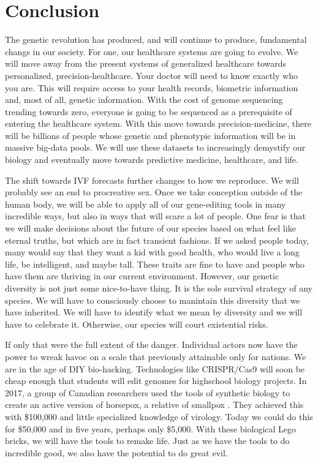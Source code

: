 \section{Conclusion}
\label{sec:conclusion}

The genetic revolution has produced, and will continue to produce, fundamental changs in our society.
For one, our healthcare systems are going to evolve.
We will move away from the present systems of generalized healthcare towards personalized, precision-healthcare.
Your doctor will need to know exactly who you are.
This will require access to your health records, biometric information and, most of all, genetic information.
With the cost of genome sequencing trending towards zero, everyone is going to be sequenced as a prerequisite of entering the healthcare system.
With this move towards precision-medicine, there will be billions of people whose genetic and phenotypic information will be in massive big-data pools.
We will use these datasets to increasingly demystify our biology and eventually move towards predictive medicine, healthcare, and life.

The shift towards IVF forecasts further changes to how we reproduce.
We will probably see an end to procreative sex.
Once we take conception outside of the human body, we will be able to apply all of our gene-editing tools in many incredible ways, but also in ways that will scare a lot of people.
One fear is that we will make decisions about the future of our species based on what feel like eternal truths, but which are in fact transient fashions.
If we asked people today, many would say that they want a kid with good health, who would live a long life, be intelligent, and maybe tall.
These traits are fine to have and people who have them are thriving in our current environment.
However, our genetic diversity is not just some nice-to-have thing.
It is the sole survival strategy of any species.
We will have to consciously choose to manintain this diversity that we have inherited.
We will have to identify what we mean by diversity and we will have to celebrate it.
Otherwise, our species will court existential risks.

If only that were the full extent of the danger.
Individual actors now have the power to wreak havoc on a scale that previously attainable only for nations.
We are in the age of DIY bio-hacking.
Technologies like CRISPR/Cas9 will soon be cheap enough that students will edit genomes for highschool biology projects.
In 2017, a group of Canadian researchers used the tools of synthetic biology to create an active version of horsepox, a relative of smallpox \cite{Kupferschmidt2017}.
They achieved this with \$100,000 and little specialized knowledge of virology.
Today we could do this for \$50,000 and in five years, perhaps only \$5,000.
With these biological Lego bricks, we will have the tools to remake life.
Just as we have the tools to do incredible good, we also have the potential to do great evil.

